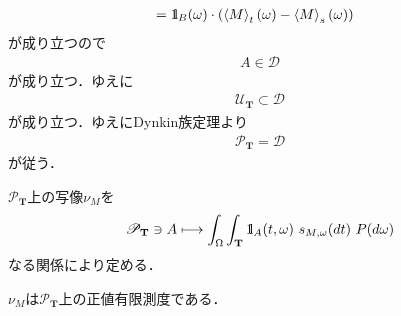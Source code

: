 \begin{sketch}
\begin{align}
			&= \defunc_B(\omega) \cdot \left(\inprod<M>_t(\omega) - \inprod<M>_s(\omega)\right)
		\end{align}
		が成り立つので
		\begin{align}
			A \in \mathscr{D}
		\end{align}
		が成り立つ．ゆえに
		\begin{align}
			\mathscr{U}_{\mathbf{T}} \subset \mathscr{D}
		\end{align}
		が成り立つ．ゆえにDynkin族定理より
		\begin{align}
			\mathscr{P}_{\mathbf{T}} = \mathscr{D}
		\end{align}
		が従う．
		\QED
	\end{sketch}
	
	$\mathscr{P}_{\mathbf{T}}$上の写像$\nu_M$を
	\begin{align}
		\mathscr{P}_{\mathbf{T}} \ni A \longmapsto
		\int_\Omega \int_{\mathbf{T}} \defunc_A(t,\omega)\ s_{M,\omega}(dt)\ P(d\omega)
	\end{align}
	なる関係により定める．
	
	\begin{screen}
		\begin{thm}[二乗可積分マルチンゲールで構成する測度]
			$\nu_M$は$\mathscr{P}_{\mathbf{T}}$上の正値有限測度である．
		\end{thm}
	\end{screen}
	
